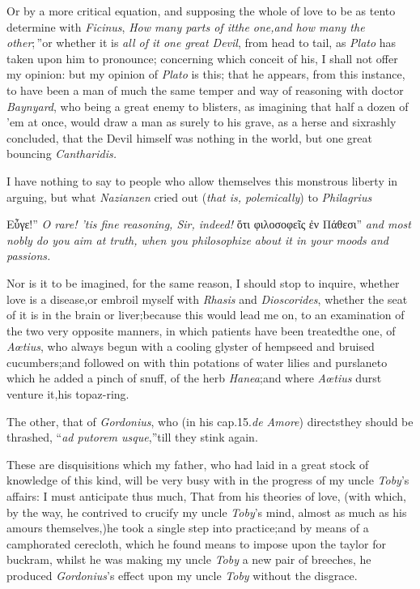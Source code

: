 \documentclass{article}
\begin{document}
\tsh Or by a more critical equation, and supposing the
whole of love to be as ten\tsh to determine with
\textit{Ficinus},\break
\lqq\textit{How many parts of it\tsk the one,\tsk and}\pb
\lqq \textit{how many the other};\,”\tsk or whether it
is \textit{all of it one great Devil}, from head to tail, as
\textit{Plato} has taken upon him to pronounce; concerning which
conceit of his, I shall not offer my opinion:\break
\tsk but my opinion of \textit{Plato} is this; that
he appears, from this instance, to have been a man of much the same
temper and way of reasoning with doctor \textit{Baynyard}, who being
a great enemy to blisters, as imagining that half a dozen of
’em at once, would draw a man as surely to his grave, as a
herse and six\tsk rashly concluded, that the Devil himself was
nothing in the world, but one great bouncing
\textit{Cantharidis.}\tsh

I have nothing to say to people who allow themselves this
monstrous liberty in arguing, but what \textit{Nazianzen} cried out
(\textit{that is, polemically}) to
\textit{Philagrius}\tsh

\indent\lqq Εὖγε!” \textit{O rare! ’tis fine reasoning, Sir, indeed!}\tsk
\lqq ὅτι φιλοσοφεῖς ἐν Πάθεσι”\pb
\tsk \textit{and most nobly do you aim at truth, when you philosophize about
it in your moods and passions.}

Nor is it to be imagined, for the same reason, I should stop to
inquire, whether love is a disease,\tsh or embroil myself
with \textit{Rhasis} and \textit{Dioscorides}, whether the seat of it
is in the brain or liver;\tsk because this would lead me on, to
an examination of the two very opposite manners, in
which patients have been treated\tsh the one, of
\textit{Aœtius}, who always begun with a cooling glyster of
hempseed and bruised cucumbers;\tsk and followed on with thin
potations of water lilies and purslane\tsk to which he added a
pinch of snuff, of the herb \textit{Hanea};\tsk and where
\textit{Aœtius} durst venture it,\tsk his\break
topaz-ring.

\tsh The other, that of \textit{Gordonius}, who (in his
cap.\@ 15.\@ \textit{de Amore}) directs\pb they should be thrashed,
“\textit{ad putorem usque},”\tsh till they stink
again.

These are disquisitions which my father, who had laid in a great
stock of knowledge of this kind, will be very busy with in the
progress of my uncle\break
\textit{Toby}’s affairs: I must anticipate thus much, That from his theories of
love, (with which, by the way, he contrived to crucify my uncle \textit{Toby}’s
mind, almost as much as his amours themselves,)\tsk he took a single step into
practice;\tsk and by means of a camphorated cerecloth, which he found means to
impose upon the taylor for buckram, whilst he was making my uncle \textit{Toby} a
new pair of breeches, he produced \textit{Gordonius}’s effect upon my uncle
\textit{Toby} without the disgrace.
\end{document}
